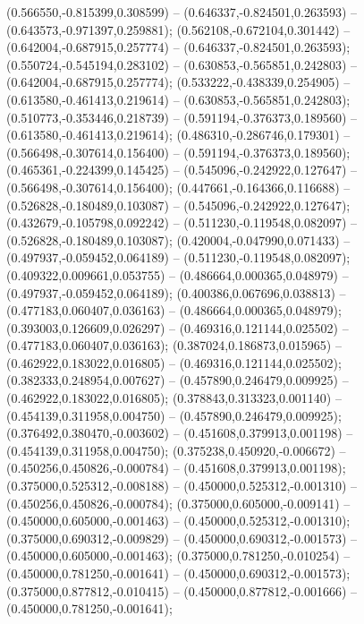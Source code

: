  (0.566550,-0.815399,0.308599) -- (0.646337,-0.824501,0.263593) -- (0.643573,-0.971397,0.259881);
 (0.562108,-0.672104,0.301442) -- (0.642004,-0.687915,0.257774) -- (0.646337,-0.824501,0.263593);
 (0.550724,-0.545194,0.283102) -- (0.630853,-0.565851,0.242803) -- (0.642004,-0.687915,0.257774);
 (0.533222,-0.438339,0.254905) -- (0.613580,-0.461413,0.219614) -- (0.630853,-0.565851,0.242803);
 (0.510773,-0.353446,0.218739) -- (0.591194,-0.376373,0.189560) -- (0.613580,-0.461413,0.219614);
 (0.486310,-0.286746,0.179301) -- (0.566498,-0.307614,0.156400) -- (0.591194,-0.376373,0.189560);
 (0.465361,-0.224399,0.145425) -- (0.545096,-0.242922,0.127647) -- (0.566498,-0.307614,0.156400);
 (0.447661,-0.164366,0.116688) -- (0.526828,-0.180489,0.103087) -- (0.545096,-0.242922,0.127647);
 (0.432679,-0.105798,0.092242) -- (0.511230,-0.119548,0.082097) -- (0.526828,-0.180489,0.103087);
 (0.420004,-0.047990,0.071433) -- (0.497937,-0.059452,0.064189) -- (0.511230,-0.119548,0.082097);
 (0.409322,0.009661,0.053755) -- (0.486664,0.000365,0.048979) -- (0.497937,-0.059452,0.064189);
 (0.400386,0.067696,0.038813) -- (0.477183,0.060407,0.036163) -- (0.486664,0.000365,0.048979);
 (0.393003,0.126609,0.026297) -- (0.469316,0.121144,0.025502) -- (0.477183,0.060407,0.036163);
 (0.387024,0.186873,0.015965) -- (0.462922,0.183022,0.016805) -- (0.469316,0.121144,0.025502);
 (0.382333,0.248954,0.007627) -- (0.457890,0.246479,0.009925) -- (0.462922,0.183022,0.016805);
 (0.378843,0.313323,0.001140) -- (0.454139,0.311958,0.004750) -- (0.457890,0.246479,0.009925);
 (0.376492,0.380470,-0.003602) -- (0.451608,0.379913,0.001198) -- (0.454139,0.311958,0.004750);
 (0.375238,0.450920,-0.006672) -- (0.450256,0.450826,-0.000784) -- (0.451608,0.379913,0.001198);
 (0.375000,0.525312,-0.008188) -- (0.450000,0.525312,-0.001310) -- (0.450256,0.450826,-0.000784);
 (0.375000,0.605000,-0.009141) -- (0.450000,0.605000,-0.001463) -- (0.450000,0.525312,-0.001310);
 (0.375000,0.690312,-0.009829) -- (0.450000,0.690312,-0.001573) -- (0.450000,0.605000,-0.001463);
 (0.375000,0.781250,-0.010254) -- (0.450000,0.781250,-0.001641) -- (0.450000,0.690312,-0.001573);
 (0.375000,0.877812,-0.010415) -- (0.450000,0.877812,-0.001666) -- (0.450000,0.781250,-0.001641);
